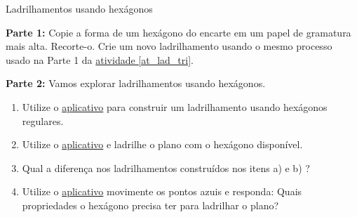 \begin{task}{Ladrilhamentos usando hexágonos} \label{lad_hex_ativ}

\textbf{Parte 1:} Copie a forma de  um hexágono do encarte em um papel de gramatura mais alta. Recorte-o. Crie um novo ladrilhamento usando o mesmo processo usado na Parte 1 da \hyperref[at_lad_tri]{atividade \ref{at_lad_tri}}. 

\textbf{Parte 2:} Vamos explorar  ladrilhamentos  usando  hexágonos. 
\begin{enumerate}

\item Utilize o  \href{https://www.geogebra.org/m/uqemfkhp#material/zfczbshq}{aplicativo} para construir um ladrilhamento usando hexágonos regulares.
\item Utilize o  \href{https://www.geogebra.org/m/uqemfkhp#material/pnhc6tep}{aplicativo} e ladrilhe o plano com o hexágono disponível.
\item Qual a diferença nos ladrilhamentos construídos nos itens a) e b) ?

\item Utilize o \href{https://www.geogebra.org/m/uqemfkhp#material/ub84tqyy}{aplicativo} movimente os pontos azuis e responda: Quais propriedades o hexágono precisa ter para ladrilhar o plano?

\end{enumerate}
\end{task}




